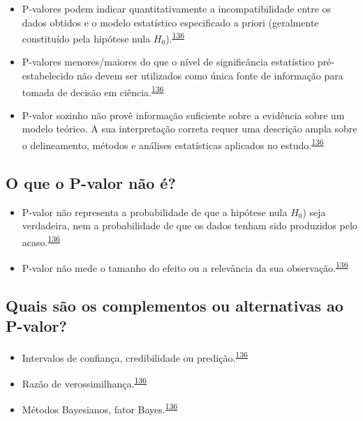 \documentclass[
]{book}
\begin{document}
\begin{itemize}
\item
  P-valores podem indicar quantitativamente a incompatibilidade entre os dados obtidos e o modelo estatístico especificado a priori (geralmente constituído pela hipótese nula \(H_{0}\)).\textsuperscript{\protect\hyperlink{ref-wasserstein2016}{136}}
\item
  P-valores menores/maiores do que o nível de significância estatístico pré-estabelecido não devem ser utilizados como única fonte de informação para tomada de decisão em ciência.\textsuperscript{\protect\hyperlink{ref-wasserstein2016}{136}}
\item
  P-valor sozinho não provê informação suficiente sobre a evidência sobre um modelo teórico. A sua interpretação correta requer uma descrição ampla sobre o delineamento, métodos e análises estatísticas aplicados no estudo.\textsuperscript{\protect\hyperlink{ref-wasserstein2016}{136}}
\end{itemize}

\hypertarget{o-que-o-p-valor-nuxe3o-uxe9}{%
\subsection{O que o P-valor não é?}\label{o-que-o-p-valor-nuxe3o-uxe9}}

\begin{itemize}
\item
  P-valor não representa a probabilidade de que a hipótese nula \(H_{0}\)) seja verdadeira, nem a probabilidade de que os dados tenham sido produzidos pelo acaso.\textsuperscript{\protect\hyperlink{ref-wasserstein2016}{136}}
\item
  P-valor não mede o tamanho do efeito ou a relevância da sua observação.\textsuperscript{\protect\hyperlink{ref-wasserstein2016}{136}}
\end{itemize}

\hypertarget{quais-suxe3o-os-complementos-ou-alternativas-ao-p-valor}{%
\subsection{Quais são os complementos ou alternativas ao P-valor?}\label{quais-suxe3o-os-complementos-ou-alternativas-ao-p-valor}}

\begin{itemize}
\item
  Intervalos de confiança, credibilidade ou predição.\textsuperscript{\protect\hyperlink{ref-wasserstein2016}{136}}
\item
  Razão de verossimilhança.\textsuperscript{\protect\hyperlink{ref-wasserstein2016}{136}}
\item
  Métodos Bayesianos, fator Bayes.\textsuperscript{\protect\hyperlink{ref-wasserstein2016}{136}}
\end{itemize}
\end{document}
